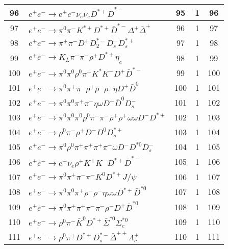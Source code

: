\documentclass[landscape]{article}
\begin{document}
\begin{table}[htbp!]
\begin{tabular}{|c|>{\centering}p{18cm}|c|c|c|}
\hline
96 & $ e^{+} e^{-} \rightarrow e^{+} e^{-} \nu_{e} \bar{\nu}_{e} D^{*+} \bar{D}^{*-} $ & 95 & 1 & 96 \\
\hline
97 & $ e^{+} e^{-} \rightarrow \pi^{0} \pi^{-} K^{*+} D^{*+} \bar{D}^{*-} \Delta^{+} \bar{\Delta}^{+} $ & 96 & 1 & 97 \\
\hline
98 & $ e^{+} e^{-} \rightarrow \pi^{+} \pi^{-} D^{+} D_{2}^{*-} D_{s}^{-} D_{s}^{*+} $ & 97 & 1 & 98 \\
\hline
99 & $ e^{+} e^{-} \rightarrow K_{L} \pi^{-} \pi^{-} \rho^{+} D^{*+} \eta_{c} $ & 98 & 1 & 99 \\
\hline
100 & $ e^{+} e^{-} \rightarrow \pi^{0} \pi^{0} \rho^{0} \pi^{+} K^{*} K^{-} D^{+} \bar{D}^{*-} $ & 99 & 1 & 100 \\
\hline
101 & $ e^{+} e^{-} \rightarrow \pi^{0} \pi^{+} \pi^{-} \rho^{+} \rho^{-} \rho^{-} \eta D^{+} \bar{D}^{0} $ & 100 & 1 & 101 \\
\hline
102 & $ e^{+} e^{-} \rightarrow \pi^{0} \pi^{0} \pi^{+} \pi^{-} \eta \omega D^{+} \bar{D}^{0} D_{s}^{-} $ & 101 & 1 & 102 \\
\hline
103 & $ e^{+} e^{-} \rightarrow \pi^{0} \pi^{0} \pi^{0} \rho^{0} \pi^{-} \pi^{-} \rho^{+} \rho^{+} \omega \omega D^{-} D^{*+} $ & 102 & 1 & 103 \\
\hline
104 & $ e^{+} e^{-} \rightarrow \rho^{0} \pi^{-} \rho^{+} D^{-} D^{0} D_{s}^{*+} $ & 103 & 1 & 104 \\
\hline
105 & $ e^{+} e^{-} \rightarrow \pi^{0} \rho^{0} \pi^{+} \pi^{+} \pi^{+} \pi^{-} \omega D^{-} D^{*0} D_{s}^{-} $ & 104 & 1 & 105 \\
\hline
106 & $ e^{+} e^{-} \rightarrow e^{-} \bar{\nu}_{e} \rho^{+} K^{+} K^{-} D^{*+} \bar{D}^{*-} $ & 105 & 1 & 106 \\
\hline
107 & $ e^{+} e^{-} \rightarrow \pi^{0} \pi^{+} \pi^{-} \pi^{-} K^{0} D^{*+} J/\psi $ & 106 & 1 & 107 \\
\hline
108 & $ e^{+} e^{-} \rightarrow \pi^{0} \pi^{0} \pi^{+} \rho^{-} \rho^{-} \eta \omega \omega D^{*+} \bar{D}^{*0} $ & 107 & 1 & 108 \\
\hline
109 & $ e^{+} e^{-} \rightarrow \pi^{0} \pi^{+} \pi^{+} \pi^{-} \pi^{-} \rho^{-} D^{+} \bar{D}^{*0} $ & 108 & 1 & 109 \\
\hline
110 & $ e^{+} e^{-} \rightarrow \rho^{0} \pi^{-} \bar{K}^{0} D^{*+} \bar{\Sigma}^{*0} \Sigma_{c}^{*0} $ & 109 & 1 & 110 \\
\hline
111 & $ e^{+} e^{-} \rightarrow \rho^{0} \pi^{+} D^{*+} D_{s}^{*-} \bar{\Delta}^{++} \Lambda_{c}^{+} $ & 110 & 1 & 111 \\

\end{tabular}
\end{table}
\end{document}
